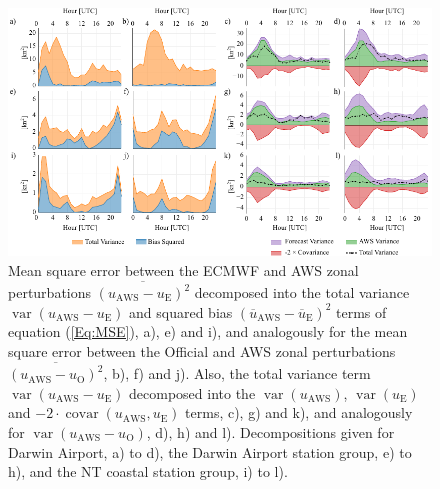 \documentclass{ametsoc}
\DeclareMathOperator{\covar}{covar}
\DeclareMathOperator{\var}{var}
\begin{document}
\begin{figure}
\centering
\includegraphics[width=39pc]{error_decomp.pdf}
\caption{Mean square error between the ECMWF and AWS zonal perturbations $\overline{\left(u_\text{AWS} - u_\text{E}\right)^2}$ decomposed into the total variance $\var\left(u_\text{AWS} - u_\text{E}\right)$ and squared bias $\left(\overline{u}_\text{AWS} - \overline{u}_\text{E}\right)^2$ terms of equation (\ref{Eq:MSE}), a), e) and i), and analogously for the mean square error between the Official and AWS zonal perturbations $\overline{\left(u_\text{AWS} - u_\text{O}\right)^2}$, b), f) and j). Also, the total variance term $\var\left(u_\text{AWS} - u_\text{E}\right)$ decomposed into the $\var\left(u_\text{AWS}\right)$, $\var\left(u_\text{E}\right)$ and  $- 2 \cdot \covar\left(u_\text{AWS}, u_\text{E}\right)$ terms, c), g) and k), and analogously for $\var\left(u_\text{AWS} - u_\text{O}\right)$, d), h) and l). Decompositions given for Darwin Airport, a) to d), the Darwin Airport station group, e) to h), and the NT coastal station group, i) to l).}
\label{Fig:error_decomp}
\end{figure}
\end{document}
